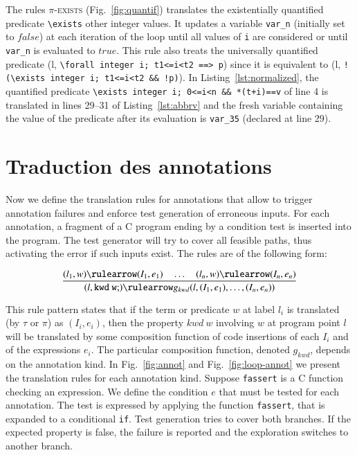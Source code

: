 The rules \textsc{$\pi$-exists}
(Fig.~\ref{fig:quantif}) translates the existentially
quantified predicate \lstinline|\exists| other integer values.
It updates
a variable \lstinline|var_n| (initially set to $false$) at each iteration of the
loop until all values of \lstinline|i| are considered or  
until \lstinline|var_n| is evaluated to $true$.
This rule also treats the universally quantified predicate
(l, \lstinline{\forall integer i; t1<=i<t2 ==> p}) since it
is equivalent to 
(l, \lstinline{! (\exists integer i; t1<=i<t2 && !p)}).
In Listing~\ref{lst:normalized}, the quantified predicate
\lstinline{\exists integer i; 0<=i<n && *(t+i)==v} of 
line 4 is translated in lines 29--31 of Listing~\ref{lst:abbrv}
and the fresh variable containing the value of the predicate after its
evaluation is \lstinline|var_35| (declared at line 29).


\section{Traduction des annotations \acsl}
\label{sec:annot}

Now we  define the translation rules for annotations that allow to trigger 
annotation failures and 
enforce 
test generation of erroneous inputs. For each annotation, a fragment of a C
program ending by a condition test is inserted into the program. The test
generator will try to cover all feasible paths, thus activating the error if
such inputs exist. The rules are of the following form:

\vspace{-4mm}
\[
\dfrac
    {(l_1, w) \rulearrow (I_1, e_1) \quad \ldots \quad
      (l_n, w) \rulearrow (I_n, e_n)}
    {(l, \mathtt{kwd\ w;}) \rulearrow
      g_{kwd} (l, (I_1, e_1), \ldots, (I_n, e_n))}
\]
\vspace{-4mm}



This rule pattern states that if the term or predicate $w$ at label $l_i$
is translated (by $\tau$ or $\pi$) as
$(I_i, e_i)$, then the property $kwd\ w$ involving $w$ at
program point $l$ will be translated by some composition 
function of code insertions of each
$I_i$ and of the expressions $e_i$. 
The particular composition function, denoted $g_{kwd}$, depends on
the annotation kind.
In Fig.~\ref{fig:annot} and Fig.~\ref{fig:loop-annot} we present the
translation rules for each annotation kind. Suppose \lstinline|fassert| is a C
function checking an expression. We define the condition $e$ that
must be tested for each annotation. The test is expressed by applying the
function \lstinline|fassert|, that is expanded to a conditional \lstinline|if|.
Test generation tries to cover both branches. If the expected property is
false, the failure is reported and the
exploration switches to another branch.

